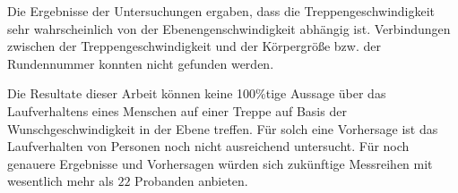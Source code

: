 	Die Ergebnisse der Untersuchungen ergaben, dass die Treppengeschwindigkeit sehr wahrscheinlich von der Ebenengenschwindigkeit abhängig ist. Verbindungen zwischen der Treppengeschwindigkeit und der Körpergröße bzw. der Rundennummer konnten nicht gefunden werden.
	
	Die Resultate dieser Arbeit können keine 100\%tige Aussage über das Laufverhaltens eines Menschen auf einer Treppe auf Basis der Wunschgeschwindigkeit in der Ebene treffen. Für solch eine Vorhersage ist das Laufverhalten von Personen noch nicht ausreichend untersucht. Für noch genauere Ergebnisse und Vorhersagen würden sich zukünftige Messreihen mit wesentlich mehr als $22$ Probanden anbieten.
	

